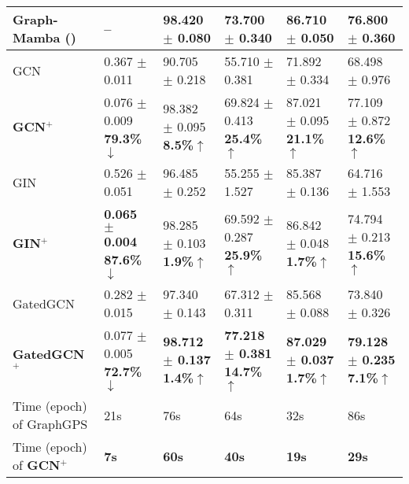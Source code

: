 \begin{table*}[t]
{\begin{tabular}{l|lllll}
        Graph-Mamba (\citeyear{wang2024graph}) & – & 98.420{\tiny{ $\pm$ 0.080}} & 73.700{\tiny{ $\pm$ 0.340}} & 86.710{\tiny{ $\pm$ 0.050}} & 76.800{\tiny{ $\pm$ 0.360}} \\
         \midrule %
        GCN & 0.367{\tiny{ $\pm$ 0.011}} & 90.705{\tiny{ $\pm$ 0.218}} & 55.710{\tiny{ $\pm$ 0.381}} & 71.892{\tiny{ $\pm$ 0.334}} & 68.498{\tiny{ $\pm$ 0.976}} \\
        \rowcolor{gray!20}
        \textbf{GCN$^+$} & 0.076{\tiny{ $\pm$ 0.009}} \textbf{79.3\%$\downarrow$} & 98.382{\tiny{ $\pm$ 0.095}} \textbf{8.5\%$\uparrow$} & 69.824{\tiny{ $\pm$ 0.413}} \textbf{25.4\%$\uparrow$} & 87.021{\tiny{ $\pm$ 0.095}} \textbf{21.1\%$\uparrow$} & 77.109{\tiny{ $\pm$ 0.872}} \textbf{12.6\%$\uparrow$} \\ 
        \midrule %
        GIN & 0.526{\tiny{ $\pm$ 0.051}} & 96.485{\tiny{ $\pm$ 0.252}} & 55.255{\tiny{ $\pm$ 1.527}} & 85.387{\tiny{ $\pm$ 0.136}} & 64.716{\tiny{ $\pm$ 1.553}} \\ 
        \rowcolor{gray!20}
         \textbf{GIN$^+$} & \textbf{\textcolor{darkorange!90}{0.065{\tiny{ $\pm$ 0.004}}}} \textbf{87.6\%$\downarrow$} & 98.285{\tiny{ $\pm$ 0.103}} \textbf{1.9\%$\uparrow$} & 69.592{\tiny{ $\pm$ 0.287}} \textbf{25.9\%$\uparrow$} & 86.842{\tiny{ $\pm$ 0.048}} \textbf{1.7\%$\uparrow$} & 74.794{\tiny{ $\pm$ 0.213}} \textbf{15.6\%$\uparrow$} \\  
        \midrule %
        GatedGCN & 0.282{\tiny{ $\pm$ 0.015}} & 97.340{\tiny{ $\pm$ 0.143}} & 67.312{\tiny{ $\pm$ 0.311}} & 85.568{\tiny{ $\pm$ 0.088}} & 73.840{\tiny{ $\pm$ 0.326}} \\
        \rowcolor{gray!20}
        \textbf{GatedGCN$^+$} & 0.077{\tiny{ $\pm$ 0.005}} \textbf{72.7\%$\downarrow$} & \textbf{\textcolor{customcyan}{98.712{\tiny{ $\pm$ 0.137}}}} \textbf{1.4\%$\uparrow$} & \textbf{\textcolor{customcyan}{77.218{\tiny{ $\pm$ 0.381}}}} \textbf{14.7\%$\uparrow$} & \textbf{\textcolor{darkorange!90}{87.029{\tiny{ $\pm$ 0.037}}}} \textbf{1.7\%$\uparrow$} & \textbf{\textcolor{darkorange!90}{79.128{\tiny{ $\pm$ 0.235}}}} \textbf{7.1\%$\uparrow$} \\  
        \midrule %
        Time (epoch) of GraphGPS &  21s & 76s & 64s & 32s & 86s \\
        \rowcolor{gray!20}
        Time (epoch) of  \textbf{GCN$^+$} & \textbf{7s} & \textbf{60s} & \textbf{40s} & \textbf{19s} & \textbf{29s} \\
        \bottomrule
	\end{tabular}}
    \vspace{-0.05 in}
	\label{tab:tab2}
\end{table*}

